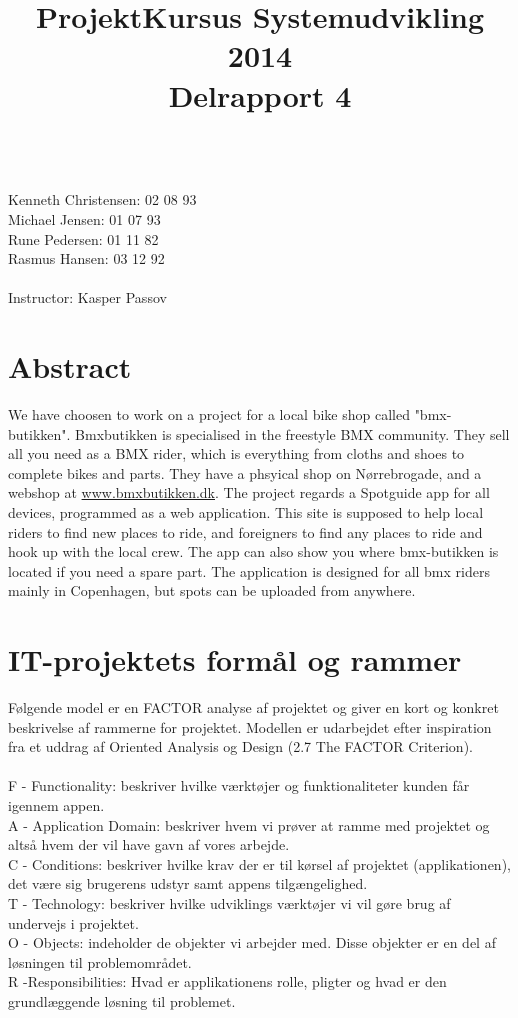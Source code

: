 \documentclass[12pt]{article}
\title{ProjektKursus Systemudvikling 2014\\Delrapport 4}
\author{}
\begin{document}
\maketitle
{}\\
Kenneth Christensen: 02 08 93\\Michael Jensen: 01 07 93\\Rune Pedersen: 01 11 82\\Rasmus Hansen: 03 12 92
\\\\
Instructor: Kasper Passov

\pagebreak
\tableofcontents
\pagebreak
\section{Abstract}
We have choosen to work on a project for a local bike shop called "bmx-butikken". Bmxbutikken is specialised in the freestyle BMX community. They sell all you need as a BMX rider, which is everything from cloths and shoes to complete bikes and parts. They have a phsyical shop on Nørrebrogade, and a webshop at \url{www.bmxbutikken.dk}. The project regards a Spotguide app for all devices, programmed as a web application. This site is supposed to help local riders to find new places to ride, and foreigners to find any places to ride and hook up with the local crew. The app can also show you where bmx-butikken is located if you need a spare part. The application is designed for all bmx riders mainly in Copenhagen, but spots can be uploaded from anywhere.

\pagebreak 

\section{IT-projektets formål og rammer}
Følgende model er en FACTOR analyse af projektet og giver en kort og konkret beskrivelse af rammerne for projektet. Modellen er udarbejdet efter inspiration fra et uddrag af Oriented Analysis og Design (2.7 The FACTOR Criterion).\\\\
F - Functionality: beskriver hvilke værktøjer og funktionaliteter kunden får igennem appen.\\
A - Application Domain: beskriver hvem vi prøver at ramme med projektet og altså hvem der vil have gavn af vores arbejde.\\
C - Conditions: beskriver hvilke krav der er til kørsel af projektet (applikationen), det være sig brugerens udstyr samt appens tilgængelighed.\\
T - Technology: beskriver hvilke udviklings værktøjer vi vil gøre brug af undervejs i projektet.\\
O - Objects: indeholder de objekter vi arbejder med. Disse objekter er en del af løsningen til problemområdet.\\
R -Responsibilities: Hvad er applikationens rolle, pligter og hvad er den grundlæggende løsning til problemet.\\
\end{document}

